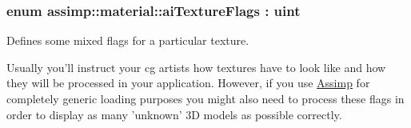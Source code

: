 \hypertarget{namespaceassimp_1_1material_a6e22b08c06f24f15471e5c167a3d6c8d}{
\subsubsection[{ai\+Texture\+Flags}]{\setlength{\rightskip}{0pt plus 5cm}enum {\bf assimp\+::material\+::ai\+Texture\+Flags} \+: uint}}\label{namespaceassimp_1_1material_a6e22b08c06f24f15471e5c167a3d6c8d}
Defines some mixed flags for a particular texture.

Usually you'll instruct your cg artists how textures have to look like and how they will be processed in your application. However, if you use \hyperlink{class_assimp}{Assimp} for completely generic loading purposes you might also need to process these flags in order to display as many 'unknown' 3\+D models as possible correctly.

